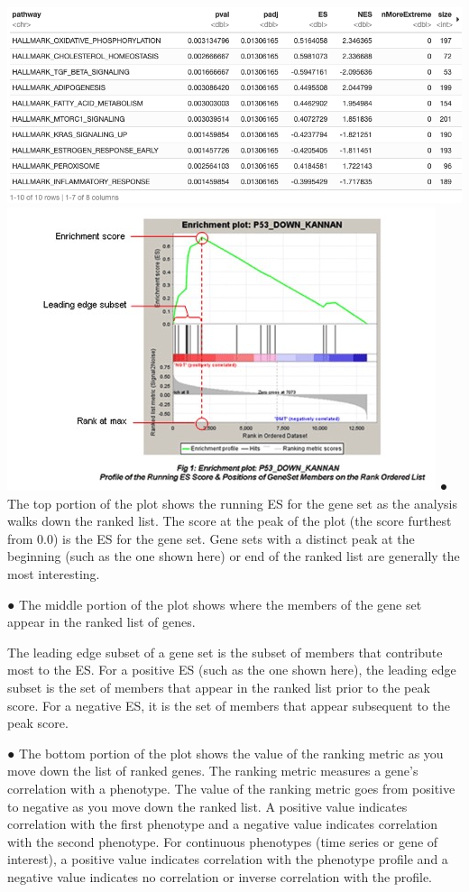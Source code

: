\documentclass[
]{article}
\begin{document}
\includegraphics{GSEA2.png} \includegraphics{gsea4.png} ● The top
portion of the plot shows the running ES for the gene set as the
analysis walks down the ranked list. The score at the peak of the plot
(the score furthest from 0.0) is the ES for the gene set. Gene sets with
a distinct peak at the beginning (such as the one shown here) or end of
the ranked list are generally the most interesting.

● The middle portion of the plot shows where the members of the gene set
appear in the ranked list of genes.

The leading edge subset of a gene set is the subset of members that
contribute most to the ES. For a positive ES (such as the one shown
here), the leading edge subset is the set of members that appear in the
ranked list prior to the peak score. For a negative ES, it is the set of
members that appear subsequent to the peak score.

● The bottom portion of the plot shows the value of the ranking metric
as you move down the list of ranked genes. The ranking metric measures a
gene's correlation with a phenotype. The value of the ranking metric
goes from positive to negative as you move down the ranked list. A
positive value indicates correlation with the first phenotype and a
negative value indicates correlation with the second phenotype. For
continuous phenotypes (time series or gene of interest), a positive
value indicates correlation with the phenotype profile and a negative
value indicates no correlation or inverse correlation with the profile.
\end{document}
